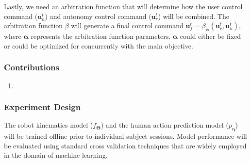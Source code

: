 \documentclass[12pt]{article}
\begin{document}
Lastly, we need an arbitration function that will determine how the user control command ($\boldsymbol{u}_h^t$) and autonomy control command ($\boldsymbol{u}_r^t$) will be combined. The arbitration function $\beta$ will generate a final control command $\boldsymbol{u}_f^{t} = \beta_{\boldsymbol{\alpha}}(\boldsymbol{u}_r^{t}, \boldsymbol{u}_h^{t})$, where $\boldsymbol{\alpha}$ represents the arbitration function parameters. $\boldsymbol{\alpha}$ could either be fixed or could be optimized for concurrently with the main objective. 
%
%
%

\subsubsection{Contributions}
\begin{enumerate}
	\item {}

\end{enumerate}

\subsubsection{Experiment Design}

The robot kinematics model ($f_{\boldsymbol{\Theta}}$) and the human action prediction model ($p_{\boldsymbol{\eta}}$) will be trained offline prior to individual subject sessions. Model performance will be evaluated using standard cross validation techniques that are widely employed in the domain of machine learning. 
\end{document}
